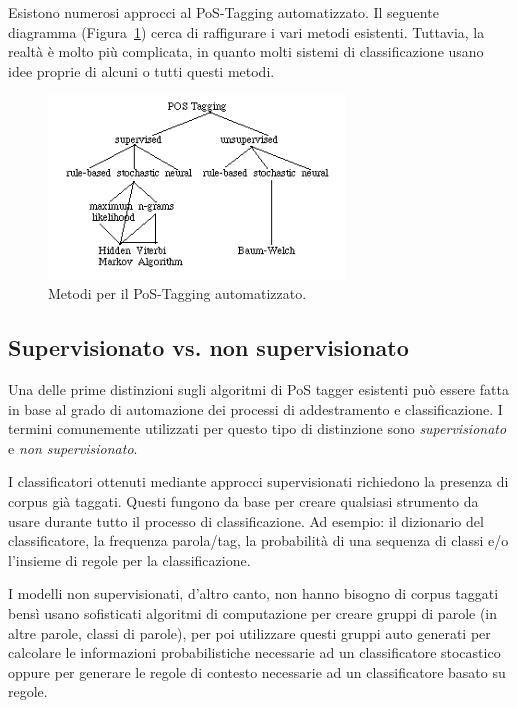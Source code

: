 Esistono numerosi approcci al PoS-Tagging automatizzato.
Il seguente diagramma (Figura~\ref{fig:feedforwardNeuralNetwork}) cerca di
raffigurare i vari metodi esistenti. Tuttavia, la realt\`a \`e molto pi\`u
complicata, in quanto molti sistemi di classificazione usano idee proprie di
alcuni o tutti questi metodi.

\begin{figure}[tp]
  \centering
  \begin{center}
    \includegraphics[width=0.7\textwidth]{./images/tagging_overview.png}
  \end{center}
  \caption{Metodi per il PoS-Tagging automatizzato.}
  \label{fig:feedforwardNeuralNetwork}
\end{figure}

\subsection{Supervisionato vs. non supervisionato}
\nocite{BrillMarcus:1993}
\nocite{Brill:1995}
\nocite{Schutze:1993}

Una delle prime distinzioni sugli algoritmi di PoS tagger esistenti pu\`o essere
fatta in base al grado di automazione dei processi di addestramento e classificazione.
I termini comunemente utilizzati per questo tipo di distinzione sono \emph{supervisionato}
e \emph{non supervisionato}.

I classificatori ottenuti mediante approcci supervisionati richiedono la presenza di corpus gi\`a taggati.
Questi fungono da base per creare qualsiasi strumento da usare durante tutto il
processo di classificazione. Ad esempio: il dizionario del classificatore, la
frequenza parola/tag, la probabilit\`a di una sequenza di classi e/o l'insieme
di regole per la classificazione.

I modelli non supervisionati, d'altro canto, non hanno bisogno di corpus taggati
bens\`i usano sofisticati algoritmi di computazione per creare gruppi di parole
(in altre parole, classi di parole), per poi utilizzare questi gruppi auto generati
per calcolare le informazioni probabilistiche necessarie ad un classificatore
stocastico oppure per generare le regole di contesto necessarie ad un classificatore
basato su regole.


